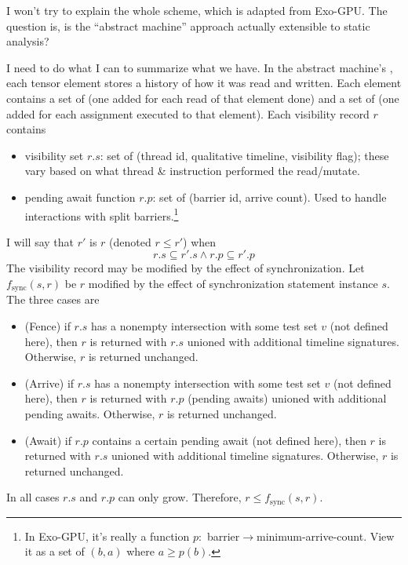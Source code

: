 
I won't try to explain the whole scheme, which is adapted from Exo-GPU.
The question is, is the ``abstract machine'' approach actually extensible to static analysis?

I need to do what I can to summarize what we have.
In the abstract machine's , each tensor element stores a history of how it was read and written.
Each element contains a set of  (one added for each read of that element done) and a set of  (one added for each assignment executed to that element).
Each visibility record $r$ contains

\begin{itemize}
  \item visibility set $r.s$: set of  (thread id, qualitative timeline, visibility flag); these vary based on what thread \& instruction performed the read/mutate.
  \item pending await function $r.p$: set of  (barrier id, arrive count). Used to handle interactions with split barriers.\footnote{In Exo-GPU, it's really a function $p:$ barrier$\to$minimum-arrive-count. View it as a set of $(b, a)$ where $a \ge p(b)$.}
\end{itemize}

I will say that $r'$ is  $r$ (denoted $r \leq r'$) when
\begin{equation*}
    r.s \subseteq r'.s \land r.p \subseteq r'.p
\end{equation*}
The visibility record may be modified by the effect of synchronization.
Let $f_\mathrm{sync}(s, r)$ be $r$ modified by the effect of synchronization statement instance $s$.
The three cases are
\begin{itemize}
  \item (Fence) if $r.s$ has a nonempty intersection with some test set $v$ (not defined here), then $r$ is returned with $r.s$ unioned with additional timeline signatures. Otherwise, $r$ is returned unchanged.
  \item (Arrive) if $r.s$ has a nonempty intersection with some test set $v$ (not defined here), then $r$ is returned with  
  $r.p$ (pending awaits) unioned with additional pending awaits. Otherwise, $r$ is returned unchanged.
  \item (Await) if $r.p$ contains a certain pending await (not defined here), then $r$ is returned with $r.s$ unioned with additional timeline signatures. Otherwise, $r$ is returned unchanged.
\end{itemize}
In all cases $r.s$ and $r.p$ can only grow. Therefore, $r \leq f_\mathrm{sync}(s, r)$.

